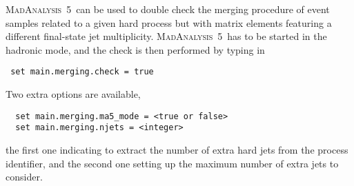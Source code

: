 \documentclass[a4paper]{article}
\newcommand{\MA}{\textsc{MadAnalysis}~5}
\begin{document}
\noindent \MA\ can be used to double check the merging procedure of event samples related
to a given hard process but with matrix elements featuring a different
final-state jet multiplicity. \MA\ has to be started in the hadronic mode, and
the check is then performed by typing in
{\color{ao}\begin{verbatim}
 set main.merging.check = true
\end{verbatim}}
\noindent Two extra options are available,
{\color{ao}\begin{verbatim}
  set main.merging.ma5_mode = <true or false>
  set main.merging.njets = <integer>
\end{verbatim}}
\noindent the first one indicating to extract the number of extra hard jets from the
process identifier, and the second one setting up the maximum number of extra
jets to consider.

\newpage
 

\end{document}
